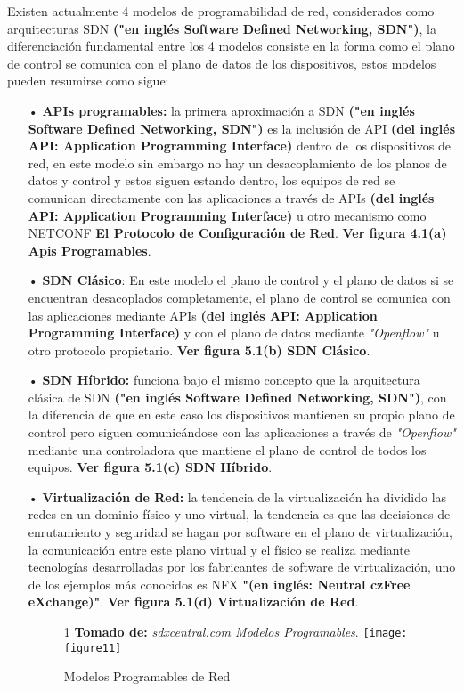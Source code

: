 Existen actualmente 4 modelos de programabilidad de red, considerados como arquitecturas SDN  \textbf{("en inglés Software Defined Networking, SDN")}, la diferenciación fundamental entre los 4 modelos consiste en la forma como el plano de control se comunica con el plano de datos de los dispositivos, estos modelos pueden resumirse como sigue:
\begin{itemize}
\item[•] \textbf{APIs programables:}  la primera aproximación a SDN  \textbf{("en inglés Software Defined Networking, SDN")} es la inclusión de API \textbf{(del inglés API: Application Programming Interface)} dentro de los dispositivos de red, en este modelo sin embargo no hay un desacoplamiento de los planos de datos y control y estos siguen estando dentro, los equipos de red se comunican directamente con las aplicaciones a través de APIs \textbf{(del inglés API: Application Programming Interface)} u otro mecanismo como NETCONF \textbf{El Protocolo de Configuración de Red}. \textbf{Ver figura 4.1(a) Apis Programables}.

\item[•] \textbf{SDN Clásico}: En este modelo el plano de control y el plano de datos si se encuentran desacoplados completamente, el plano de control se comunica con las aplicaciones mediante APIs \textbf{(del inglés API: Application Programming Interface)} y con el plano de datos mediante \textit{"Openflow"} u otro protocolo propietario. \textbf{Ver figura 5.1(b) SDN Clásico}.

\item[•] \textbf{SDN Híbrido:} funciona bajo el mismo concepto que la arquitectura clásica de SDN  \textbf{("en inglés Software Defined Networking, SDN")}, con la diferencia de que en este caso los dispositivos mantienen su propio plano de control pero siguen comunicándose con las aplicaciones a través de \textit{"Openflow"} mediante una controladora que mantiene el plano de control de todos los equipos. \textbf{Ver figura 5.1(c) SDN Híbrido}.

\item[•]\textbf{Virtualización de Red:} la tendencia de la virtualización ha dividido las redes en un dominio físico y uno virtual, la tendencia es que las decisiones de enrutamiento y seguridad se hagan por software en el plano de virtualización, la comunicación entre este plano virtual y el físico se realiza mediante tecnologías desarrolladas por los fabricantes de software de virtualización, uno de los ejemplos más conocidos es NFX \textbf{"(en inglés: Neutral czFree eXchange)"}. \textbf{Ver figura 5.1(d) Virtualización de Red}.

\begin{figure}[htbp]
 \ref{fig:sdxcentral} \textbf{Tomado de:} \textit{sdxcentral.com Modelos  Programables}.
  \centering
    {\texttt{[image: figure11]}}%
  \caption{Modelos Programables de Red}
  \label{fig:sdxcentral}
\end{figure}

\end{itemize}

